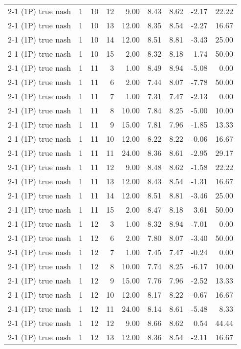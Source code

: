 \begin{tabular}{lrrrrrrrr}
2-1 (1P) true nash & 1 & 10 & 12 & 9.00 & 8.43 & 8.62 & -2.17 & 22.22 \\
2-1 (1P) true nash & 1 & 10 & 13 & 12.00 & 8.35 & 8.54 & -2.27 & 16.67 \\
2-1 (1P) true nash & 1 & 10 & 14 & 12.00 & 8.51 & 8.81 & -3.43 & 25.00 \\
2-1 (1P) true nash & 1 & 10 & 15 & 2.00 & 8.32 & 8.18 & 1.74 & 50.00 \\
2-1 (1P) true nash & 1 & 11 & 3 & 1.00 & 8.49 & 8.94 & -5.08 & 0.00 \\
2-1 (1P) true nash & 1 & 11 & 6 & 2.00 & 7.44 & 8.07 & -7.78 & 50.00 \\
2-1 (1P) true nash & 1 & 11 & 7 & 1.00 & 7.31 & 7.47 & -2.13 & 0.00 \\
2-1 (1P) true nash & 1 & 11 & 8 & 10.00 & 7.84 & 8.25 & -5.00 & 10.00 \\
2-1 (1P) true nash & 1 & 11 & 9 & 15.00 & 7.81 & 7.96 & -1.85 & 13.33 \\
2-1 (1P) true nash & 1 & 11 & 10 & 12.00 & 8.22 & 8.22 & -0.06 & 16.67 \\
2-1 (1P) true nash & 1 & 11 & 11 & 24.00 & 8.36 & 8.61 & -2.95 & 29.17 \\
2-1 (1P) true nash & 1 & 11 & 12 & 9.00 & 8.48 & 8.62 & -1.58 & 22.22 \\
2-1 (1P) true nash & 1 & 11 & 13 & 12.00 & 8.43 & 8.54 & -1.31 & 16.67 \\
2-1 (1P) true nash & 1 & 11 & 14 & 12.00 & 8.51 & 8.81 & -3.46 & 25.00 \\
2-1 (1P) true nash & 1 & 11 & 15 & 2.00 & 8.47 & 8.18 & 3.61 & 50.00 \\
2-1 (1P) true nash & 1 & 12 & 3 & 1.00 & 8.32 & 8.94 & -7.01 & 0.00 \\
2-1 (1P) true nash & 1 & 12 & 6 & 2.00 & 7.80 & 8.07 & -3.40 & 50.00 \\
2-1 (1P) true nash & 1 & 12 & 7 & 1.00 & 7.45 & 7.47 & -0.24 & 0.00 \\
2-1 (1P) true nash & 1 & 12 & 8 & 10.00 & 7.74 & 8.25 & -6.17 & 10.00 \\
2-1 (1P) true nash & 1 & 12 & 9 & 15.00 & 7.76 & 7.96 & -2.52 & 13.33 \\
2-1 (1P) true nash & 1 & 12 & 10 & 12.00 & 8.17 & 8.22 & -0.67 & 16.67 \\
2-1 (1P) true nash & 1 & 12 & 11 & 24.00 & 8.14 & 8.61 & -5.48 & 8.33 \\
2-1 (1P) true nash & 1 & 12 & 12 & 9.00 & 8.66 & 8.62 & 0.54 & 44.44 \\
2-1 (1P) true nash & 1 & 12 & 13 & 12.00 & 8.36 & 8.54 & -2.11 & 16.67 \\

\end{tabular}
